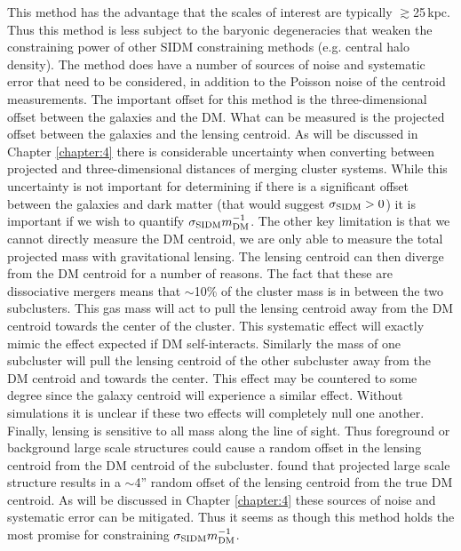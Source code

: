 This method has the advantage that the scales of interest are typically $\gtrsim$25\,kpc.
Thus this method is less subject to the baryonic degeneracies that weaken the constraining power of other SIDM constraining methods (e.g. central halo density).
The method does have a number of sources of noise and systematic error that need to be considered, in addition to the Poisson noise of the centroid measurements.
The important offset for this method is the three-dimensional offset between the galaxies and the DM.
What can be measured is the projected offset between the galaxies and the lensing centroid.
As will be discussed in Chapter \ref{chapter:4} there is considerable uncertainty when converting between projected and three-dimensional distances of merging cluster systems.
While this uncertainty is not important for determining if there is a significant offset between the galaxies and dark matter (that would suggest $\sigma_{\rm SIDM}>0$) it is important if we wish to quantify $\sigma_{\rm SIDM}m^{-1}_{\rm DM}$.
The other key limitation is that we cannot directly measure the DM centroid, we are only able to measure the total projected mass with gravitational lensing.
The lensing centroid can then diverge from the DM centroid for a number of reasons.
The fact that these are dissociative mergers means that $\sim$10\% of the cluster mass is in between the two subclusters.
This gas mass will act to pull the lensing centroid away from the DM centroid towards the center of the cluster.
This systematic effect will exactly mimic the effect expected if DM self-interacts.
Similarly the mass of one subcluster will pull the lensing centroid of the other subcluster away from the DM centroid and towards the center.
This effect may be countered to some degree since the galaxy centroid will experience a similar effect.
Without simulations it is unclear if these two effects will completely null one another.
Finally, lensing is sensitive to all mass along the line of sight.
Thus foreground or background large scale structures could cause a random offset in the lensing centroid from the DM centroid of the subcluster.
\citet{Dietrich:2011gs} found that projected large scale structure results in a $\sim$4'' random offset of the lensing centroid from the true DM centroid.
As will be discussed in Chapter \ref{chapter:4} these sources of noise and systematic error can be mitigated.
Thus it seems as though this method holds the most promise for constraining $\sigma_{\rm SIDM}m^{-1}_{\rm DM}$.